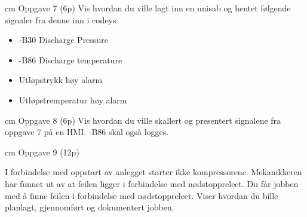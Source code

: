  cm
Oppgave 7 (6p) %
\vskip 2.5pt 
Vis hvordan du ville lagt inn en unisab og hentet følgende signaler fra denne inn i codeys
\begin{itemize}[noitemsep]
	\item -B30 Discharge Pressure
	\item -B86 Discharge temperature
	\item Utløpstrykk høy alarm
	\item Utløpstremperatur høy alarm
\end{itemize}


 cm
Oppgave 8 (6p)
\vskip 2.5pt 
Vis hvordan du ville skallert og presentert signalene fra oppgave 7 på en HMI. -B86 skal også logges. 


 cm
Oppgave 9 (12p)

\vskip 5pt 
I forbindelse med oppstart av anlegget starter ikke kompressorene. Mekanikkeren har funnet ut av at feilen ligger i forbindelse med nødstoppreleet. Du får jobben med å finne feilen i forbindelse med nødstoppreleet. 
\vskip 10pt 
Viser hvordan du bille planlagt, gjennomført og dokumentert jobben. 

